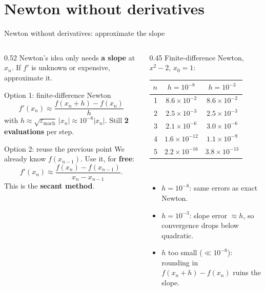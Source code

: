 \documentclass[aspectratio=169]{beamer}
\begin{document}
\section{Newton without derivatives}

\begin{frame}{Newton without derivatives: approximate the slope}
\begin{columns}[T]
\begin{column}{0.52\textwidth}
\small
Newton's idea only needs \textbf{a slope} at $x_n$. If $f'$ is unknown or expensive, approximate it.
\begin{block}{Option 1: finite-difference Newton}
\footnotesize
\[
f'(x_n) \approx \frac{f(x_n + h) - f(x_n)}{h}
\]
with $h \approx \sqrt{\varepsilon_{\text{mach}}}\,|x_n| \approx 10^{-8}|x_n|$. Still \textbf{2 evaluations} per step.
\end{block}
\begin{exampleblock}{Option 2: reuse the previous point}
\footnotesize
We already know $f(x_{n-1})$. Use it, for \textbf{free}:
\[
f'(x_n) \approx \frac{f(x_n) - f(x_{n-1})}{x_n - x_{n-1}}.
\]
This is the \textbf{secant method}.
\end{exampleblock}
\end{column}
\begin{column}{0.45\textwidth}
\centering
\footnotesize
Finite-difference Newton, $x^2 - 2$, $x_0 = 1$:\\[3pt]
\setlength{\tabcolsep}{4pt}
\begin{tabular}{rcc}
\toprule
$n$ & $h = 10^{-8}$ & $h = 10^{-3}$ \\
\midrule
1 & $8.6\times10^{-2}$ & $8.6\times10^{-2}$ \\
2 & $2.5\times10^{-3}$ & $2.5\times10^{-3}$ \\
3 & $2.1\times10^{-6}$ & $3.0\times10^{-6}$ \\
4 & $1.6\times10^{-12}$ & $1.1\times10^{-9}$ \\
5 & $2.2\times10^{-16}$ & $3.8\times10^{-13}$ \\
\bottomrule
\end{tabular}\\[4pt]
\raggedright
\scriptsize
\begin{itemize}
  \item $h = 10^{-8}$: same errors as exact Newton.
  \item $h = 10^{-3}$: slope error $\approx h$, so convergence drops below quadratic.
  \item $h$ too small ($\ll 10^{-8}$): rounding in $f(x_n+h) - f(x_n)$ ruins the slope.
\end{itemize}
\end{column}
\end{columns}
\end{frame}
\end{document}
